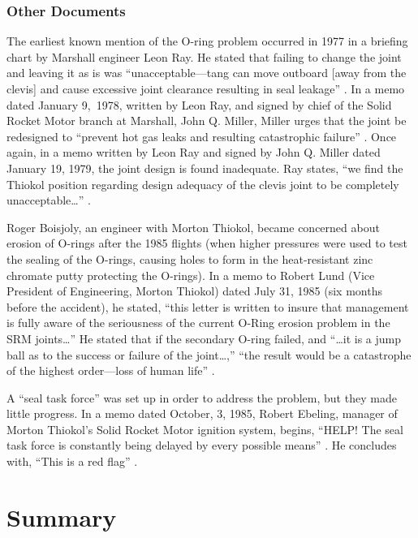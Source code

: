 \subsubsection{Other Documents}

The earliest known mention of the O-ring problem occurred in
1977 in a briefing chart by Marshall engineer Leon Ray.
He stated that failing to change the joint and leaving it as is
was ``unacceptable---tang can move outboard [away from the
clevis] and cause
excessive joint clearance resulting in seal leakage''
\cite[vol. 1, p. 233]{rogers}.  In a memo dated January 9,~1978, 
written by Leon Ray, and signed by chief of the Solid
Rocket Motor branch at Marshall, John Q. Miller, Miller
urges that the joint be redesigned to ``prevent hot gas
leaks and resulting catastrophic failure''
\cite[vol. 1, p. 234--235]{rogers}.  Once again, in a memo
written by Leon Ray and signed by John Q. Miller dated
January 19, 1979, the joint design is found inadequate.
Ray states, ``we find the Thiokol position regarding design
adequacy of the clevis joint to be completely
unacceptable\ldots'' \cite[vol. 1, p. 236]{rogers}.

Roger Boisjoly, an engineer with Morton Thiokol, became
concerned about erosion of O-rings after the 1985 flights
(when higher pressures were used to test the sealing of the
O-rings, causing holes to form in the heat-resistant zinc
chromate putty protecting the O-rings).
In a memo to Robert Lund (Vice President of Engineering,
Morton Thiokol)
dated July 31, 1985 (six months before the accident), he
stated, ``this letter is written to insure that management
is fully aware of the seriousness of the current O-Ring
erosion problem in the SRM joints\ldots''  He stated that if
the secondary O-ring failed, and ``\ldots it is a jump ball
as to the success or failure of the joint\ldots,'' ``the
result would be a catastrophe of the highest order---loss of
human life'' \cite[vol. 1, p. 249]{rogers}.

A ``seal task force'' was set up in order to address the
problem, but they made little progress.
In a memo dated October, 3, 1985, Robert Ebeling, manager of
Morton Thiokol's Solid Rocket Motor ignition system, begins,
``HELP! The seal task force is constantly being delayed by every
possible means'' \cite[vol. 1, p. 252]{rogers}. He concludes
with, ``This is a red flag'' \cite[vol. 1, p.
252]{rogers}.

\section{Summary}

